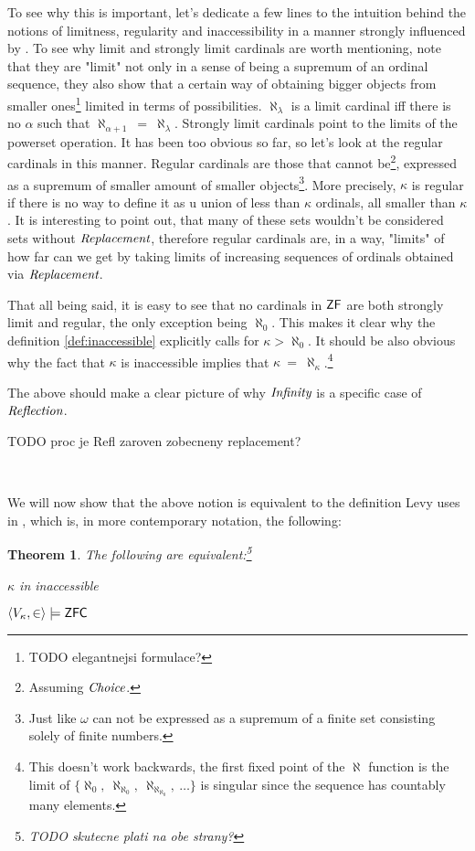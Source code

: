 \documentclass[12pt,a4paper]{article}
\newtheorem{theorem}{Theorem}[section]
\newcommand{\bce}{\begin{compactenum}}
\newcommand{\ece}{\end{compactenum}}
\begin{document}
To see why this is important, let's dedicate a few lines to the intuition behind the notions of limitness, regularity and inaccessibility in a manner strongly influenced by \cite{Infinity_in_mind}. To see why limit and strongly limit cardinals are worth mentioning, note that they are "limit" not only in a sense of being a supremum of an ordinal sequence, they also show that a certain way of obtaining bigger objects from smaller ones\footnote{TODO elegantnejsi formulace?} limited in terms of possibilities. $\aleph_\lambda$ is a limit cardinal iff there is no $\alpha$ such that $\aleph_{\alpha+1}\ =\ \aleph_\lambda$. Strongly limit cardinals point to the limits of the powerset operation. It has been too obvious so far, so let's look at the regular cardinals in this manner. Regular cardinals are those that cannot be\footnote{Assuming $\emph{Choice}$.}, expressed as a supremum of smaller amount of smaller objects\footnote{Just like $\omega$ can not be expressed as a supremum of a finite set consisting solely of finite numbers.}. More precisely, $\kappa$ is regular if there is no way to define it as u union of less than $\kappa$ ordinals, all smaller than $\kappa$. It is interesting to point out, that many of these sets wouldn't be considered sets without $\emph{Replacement}$, therefore regular cardinals are, in a way, "limits" of how far can we get by taking limits of increasing sequences of ordinals obtained via $\emph{Replacement}$.

That all being said, it is easy to see that no cardinals in $\sf{ZF}$ are both strongly limit and regular, the only exception being $\aleph_0$. This makes it clear why the definition \ref{def:inaccessible} explicitly calls for $\kappa > \aleph_0$. It should be also obvious why the fact that $\kappa$ is inaccessible implies that $\kappa\ =\ \aleph_\kappa$.\footnote{This doesn't work backwards,  the first fixed point of the $\aleph$ function is the limit of $\{\aleph_0,\ \aleph_{\aleph_0},\ \aleph_{\aleph_{\aleph_0}},\ \ldots \}$ is singular since the sequence has countably many elements.}

The above should make a clear picture of why $\emph{Infinity}$ is a specific case of $\emph{Reflection}$.

TODO proc je Refl zaroven zobecneny replacement?

\

We will now show that the above notion is equivalent to the definition Levy uses in \cite{Levy60a}, which is, in more contemporary notation, the following:
\begin{theorem}\label{theorem:inaccessible_models_zfc}
The following are equivalent:\footnote{TODO skutecne plati na obe strany? %
}
\bce
\item $\kappa$ in inaccessible
\item $\langle V_\kappa, \in \rangle \models \sf{ZFC}$
\ece
\end{theorem}
\end{document}
